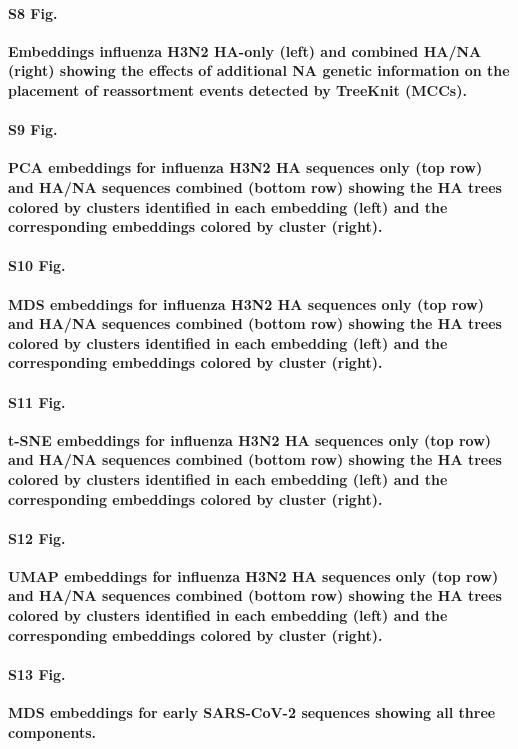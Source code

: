 \documentclass[10pt,letterpaper]{article}
\begin{document}
\paragraph*{S8 Fig.}
\label{S8_Fig_full_ha_na_embeddings}
{\bf Embeddings influenza H3N2 HA-only (left) and combined HA/NA (right) showing the effects of additional NA genetic information on the placement of reassortment events detected by TreeKnit (MCCs).}

\paragraph*{S9 Fig.}
\label{S9_Fig_flu_ha_na_pca_embeddings}
{\bf PCA embeddings for influenza H3N2 HA sequences only (top row) and HA/NA sequences combined (bottom row) showing the HA trees colored by clusters identified in each embedding (left) and the corresponding embeddings colored by cluster (right).}

\paragraph*{S10 Fig.}
\label{S10_Fig_flu_ha_na_mds_embeddings}
{\bf MDS embeddings for influenza H3N2 HA sequences only (top row) and HA/NA sequences combined (bottom row) showing the HA trees colored by clusters identified in each embedding (left) and the corresponding embeddings colored by cluster (right).}

\paragraph*{S11 Fig.}
\label{S11_Fig_flu_ha_na_tsne_embeddings}
{\bf t-SNE embeddings for influenza H3N2 HA sequences only (top row) and HA/NA sequences combined (bottom row) showing the HA trees colored by clusters identified in each embedding (left) and the corresponding embeddings colored by cluster (right).}

\paragraph*{S12 Fig.}
\label{S12_Fig_flu_ha_na_umap_embeddings}
{\bf UMAP embeddings for influenza H3N2 HA sequences only (top row) and HA/NA sequences combined (bottom row) showing the HA trees colored by clusters identified in each embedding (left) and the corresponding embeddings colored by cluster (right).}

\paragraph*{S13 Fig.}
\label{S13_Fig_sarscov2_early_mds}
{\bf MDS embeddings for early SARS-CoV-2 sequences showing all three components.}
\end{document}
